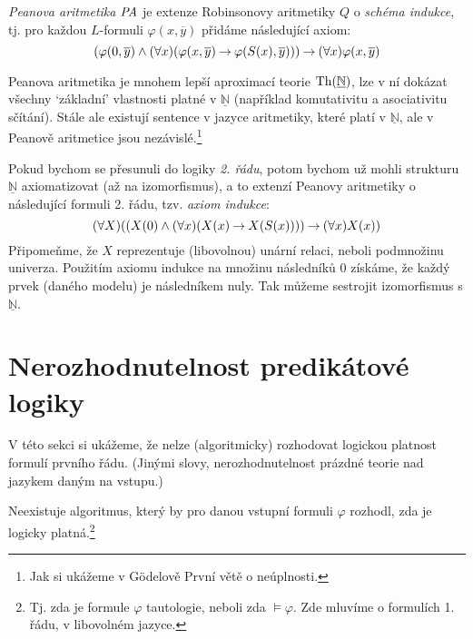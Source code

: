 \begin{definition}
\emph{Peanova aritmetika} $\text{\it PA}$ je extenze Robinsonovy  aritmetiky $Q$ o \emph{schéma indukce}, tj. pro každou $L$-formuli $\varphi(x,\overline{y})$ přidáme následující axiom:
$$
(\varphi(0,\overline{y}) \land (\forall x)(\varphi(x,\overline{y})\mathbin{\rightarrow} \varphi(S(x),\overline{y}))) \mathbin{\rightarrow} (\forall x)\varphi(x,\overline{y})
$$
\end{definition}

Peanova aritmetika je mnohem lepší aproximací teorie $\operatorname{Th}(\underline{\mathbb N})$, lze v ní dokázat všechny `základní' vlastnosti platné v $\underline{\mathbb N}$ (například komutativitu a asociativitu sčítání). Stále ale existují sentence v jazyce aritmetiky, které platí v $\underline{\mathbb N}$, ale v Peanově aritmetice jsou nezávislé.\footnote{Jak si ukážeme v Gödelově První větě o neúplnosti.} 

\begin{remark}
Pokud bychom se přesunuli do logiky \emph{2. řádu}, potom bychom už mohli strukturu $\underline{\mathbb N}$ axiomatizovat (až na izomorfismus), a to extenzí Peanovy aritmetiky o následující formuli 2. řádu, tzv. \emph{axiom indukce}:
$$
(\forall X)((X(0) \land (\forall x)(X(x) \mathbin{\rightarrow} X(S(x)))) \mathbin{\rightarrow} (\forall x)X(x))
$$
Připomeňme, že $X$ reprezentuje (libovolnou) unární relaci, neboli podmnožinu univerza. Použitím axiomu indukce na množinu následníků 0 získáme, že každý prvek (daného modelu) je následníkem nuly. Tak můžeme sestrojit izomorfismus s $\underline{\mathbb N}$.
\end{remark}

\section{Nerozhodnutelnost predikátové logiky}
    
V této sekci si ukážeme, že nelze (algoritmicky) rozhodovat logickou platnost formulí prvního řádu. (Jinými slovy, nerozhodnutelnost prázdné teorie nad jazykem daným na vstupu.)

\begin{theorem}\label{theorem:undecidability-of-predicate-logic}
Neexistuje algoritmus, který by pro danou vstupní formuli $\varphi$ rozhodl, zda je logicky platná.\footnote{Tj. zda je formule $\varphi$ tautologie, neboli zda $\models\varphi$. Zde mluvíme o formulích 1. řádu, v libovolném jazyce.}
\end{theorem}

